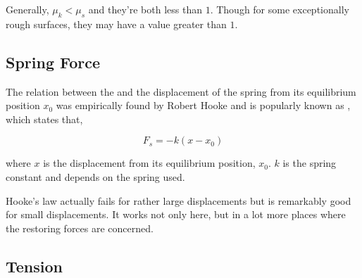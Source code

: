 Generally, \(\mu_k < \mu_s\) and they're both less than \(1\). Though for some exceptionally rough surfaces, they
may have a value greater than \(1\).

\subsection{Spring Force}

The relation between the  and the displacement of the spring
from its equilibrium position \(x_0\) was empirically found by Robert Hooke and is popularly 
known as , which states that,

\begin{equation}
    F_s = -k(x - x_0)
\end{equation}

where \(x\) is the displacement from its equilibrium position, \(x_0\). \(k\) is the
spring constant and depends on the spring used. 

Hooke's law actually fails for rather large displacements but is remarkably good for 
small displacements. It works not only here, but in a lot more places where the restoring forces 
are concerned.

\subsection{Tension}
